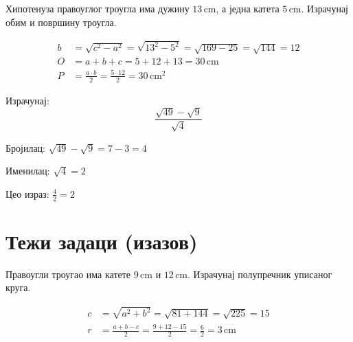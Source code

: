 \documentclass[11pt,a5paper,twoside,addpoints,answers]{exam} %
\newcommand{\measure}[2]{\mathrm{#1\,#2}}
\newcommand{\variant}[3]{#1}
\begin{document}
\begin{questions}
\question[4]
Хипотенуза правоуглог троугла има дужину $\measure{\variant{13}{25}{10}}{cm}$, а једна катета $\measure{\variant{5}{20}{6}}{cm}$. Израчунај обим и површину троугла.
\begin{solution}[\stretch 4]
\begin{align*}
b &= \sqrt{c^2 - a^2}
= \sqrt{\variant{13}{25}{10}^2 - \variant{5}{20}{6}^2}
= \sqrt{\variant{169-25}{625-400}{100-36}}
= \sqrt{\variant{144}{225}{64}} = \variant{12}{15}{8}
\\
O &= a + b + c = \variant{5+12+13}{20+15+25}{6+8+10}
= \measure{\variant{30}{60}{24}}{cm}
\\
P &= \frac{a\cdot b}{2}
= \frac{\variant{5}{20}{6}\cdot\variant{12}{15}{8}}{2}
= \measure{\variant{30}{150}{24}}{cm^2}
\end{align*}
\end{solution}
\ifprintanswers
\else\newpage
\fi

\question[3]
Израчунај:
$$
\frac{\sqrt{\variant{49}{81}{25}} - \sqrt{\variant{9}{16}{4}}}{\sqrt{\variant{4}{9}{16}}}
$$
\begin{solution}[\stretch 3]
Бројилац: $\sqrt{\variant{49}{81}{25}} - \sqrt{\variant{9}{16}{4}}
= \variant{7-3}{9-4}{5-2} = \variant{4}{5}{3}$

Именилац: $\sqrt{\variant{4}{9}{16}} = \variant{2}{3}{4}$

Цео израз: $\frac{\variant{4}{5}{3}}{\variant{2}{3}{4}}
= \variant{2}{\frac{5}{3}}{\frac{3}{4}}$
\end{solution}
\ifprintanswers\newpage
\else\answerline
\fi

\section{Тежи задаци (изазов)}

\question[5]
Правоугли троугао има катете $\measure{\variant{9}{15}{7}}{cm}$ и $\measure{\variant{12}{8}{24}}{cm}$. Израчунај полупречник уписаног круга.
\begin{solution}[\stretch 4]
\begin{align*}
c &= \sqrt{a^2 + b^2} = \sqrt{\variant{81+144}{225+64}{49+576}}
= \sqrt{\variant{225}{289}{625}} = \variant{15}{17}{25}
\\
r &= \frac{a+b-c}{2}
= \frac{\variant{9+12-15}{15+8-17}{7+24-25}}{2}
= \frac{\variant{6}{6}{6}}{2} = \measure 3{cm}
\end{align*}
\end{solution}
\ifprintanswers
\else\newpage
\fi


\end{questions}
\end{document}
